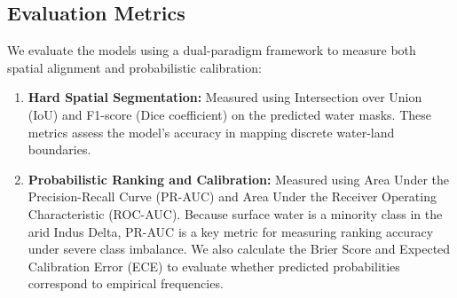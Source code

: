 \documentclass[preprint,12pt]{elsarticle}
\begin{document}
\begin{table}[htbp]
\caption{Verified Model Hyperparameters and Architectural Specifications (\texttt{MFPIT\_Model.py})}
\label{tab:hyperparams}
\centering
{}
\end{table}

\subsection{Evaluation Metrics}
We evaluate the models using a dual-paradigm framework to measure both spatial alignment and probabilistic calibration:
\begin{enumerate}
    \item \textbf{Hard Spatial Segmentation:} Measured using Intersection over Union (IoU) and F1-score (Dice coefficient) on the predicted water masks. These metrics assess the model's accuracy in mapping discrete water-land boundaries.
    \item \textbf{Probabilistic Ranking and Calibration:} Measured using Area Under the Precision-Recall Curve (PR-AUC) and Area Under the Receiver Operating Characteristic (ROC-AUC). Because surface water is a minority class in the arid Indus Delta, PR-AUC is a key metric for measuring ranking accuracy under severe class imbalance. We also calculate the Brier Score and Expected Calibration Error (ECE) to evaluate whether predicted probabilities correspond to empirical frequencies.
\end{enumerate}
\end{document}
